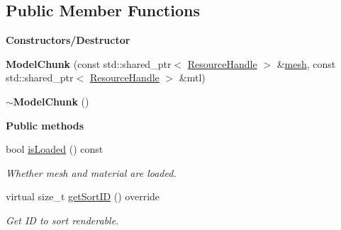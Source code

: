 \subsection*{Public Member Functions}
\begin{Indent}\textbf{ Constructors/\+Destructor}\par
\begin{DoxyCompactItemize}
\item 
\mbox{\label{classrev_1_1_model_chunk_a7d5af1656a84709e4856dbc34475338e}} 
{\bfseries Model\+Chunk} (const std\+::shared\+\_\+ptr$<$ \mbox{\hyperlink{classrev_1_1_resource_handle}{Resource\+Handle}} $>$ \&\mbox{\hyperlink{classrev_1_1_renderable_a353c19ed75be285e098c03b75dc31b1f}{mesh}}, const std\+::shared\+\_\+ptr$<$ \mbox{\hyperlink{classrev_1_1_resource_handle}{Resource\+Handle}} $>$ \&mtl)
\item 
\mbox{\label{classrev_1_1_model_chunk_a47e8b27c58d7e33d568fa5da73565201}} 
{\bfseries $\sim$\+Model\+Chunk} ()
\end{DoxyCompactItemize}
\end{Indent}
\begin{Indent}\textbf{ Public methods}\par
\begin{DoxyCompactItemize}
\item 
\mbox{\label{classrev_1_1_model_chunk_acd2ece63e8e0dfeae0f10e49276413b9}} 
bool \mbox{\hyperlink{classrev_1_1_model_chunk_acd2ece63e8e0dfeae0f10e49276413b9}{is\+Loaded}} () const
\begin{DoxyCompactList}\small\item\em Whether mesh and material are loaded. \end{DoxyCompactList}\item 
\mbox{\label{classrev_1_1_model_chunk_aa983ba8a7706dcda0afc07f05dd63fa7}} 
virtual size\+\_\+t \mbox{\hyperlink{classrev_1_1_model_chunk_aa983ba8a7706dcda0afc07f05dd63fa7}{get\+Sort\+ID}} () override
\begin{DoxyCompactList}\small\item\em Get ID to sort renderable. \end{DoxyCompactList}\end{DoxyCompactItemize}
\end{Indent}
